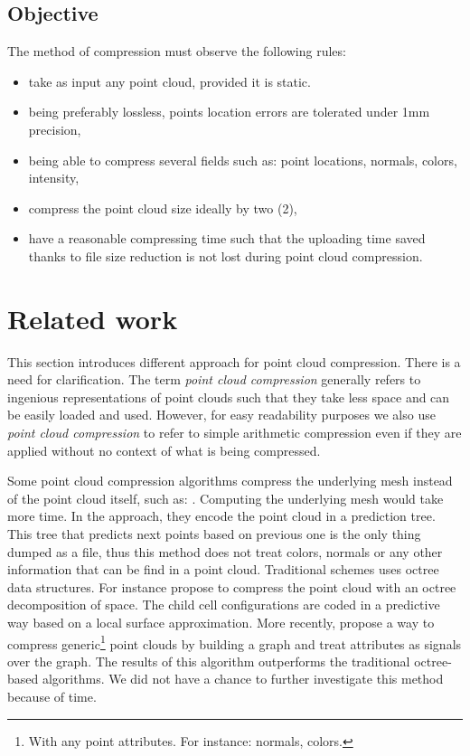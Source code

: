 \subsection{Objective}
The method of compression must observe the following rules:
\begin{itemize}
  \item take as input any point cloud, provided it is static.
  \item being preferably lossless, points location errors are tolerated under 1mm precision,
  \item being able to compress several fields such as: point locations, normals, colors, intensity,
  \item compress the point cloud size ideally by two (2),
  \item have a reasonable compressing time such that the uploading time saved thanks to file size reduction is not lost during point cloud compression.
\end{itemize}

\section{Related work}
\label{sc:work-compression}
This section introduces different approach for point cloud compression. There is a need for clarification. The term \emph{point cloud compression} generally refers to ingenious representations of point clouds such that they take less space and can be easily loaded and used. However, for easy readability purposes we also use \emph{point cloud compression} to refer to simple arithmetic compression even if they are applied without no context of what is being compressed.

Some point cloud compression algorithms compress the underlying mesh instead of the point cloud itself, such as: \cite{gumhold2, rossignac}. Computing the underlying mesh would take more time. In the \cite{gumhold} approach, they encode the point cloud in a prediction tree. This tree that predicts next points based on previous one is the only thing dumped as a file, thus this method does not treat colors, normals or any other information that can be find in a point cloud. Traditional schemes uses octree data structures. For instance \cite{schnabel, huang} propose to compress the point cloud with an octree decomposition of space. The child cell configurations are coded in a predictive way based on a local surface approximation. More recently, \cite{zhang} propose a way to compress generic\footnote{With any point attributes. For instance: normals, colors.} point clouds by building a graph and treat attributes as signals over the graph. The results of this algorithm outperforms the traditional octree-based algorithms. We did not have a chance to further investigate this method because of time.

